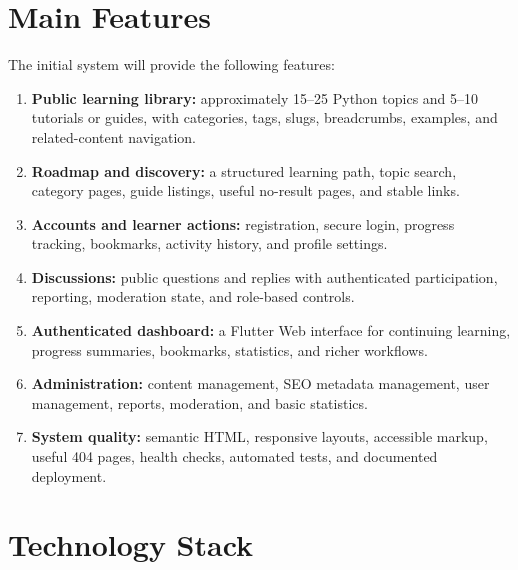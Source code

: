 \documentclass[11pt,a4paper]{article}
\begin{document}
\section{Main Features}

The initial system will provide the following features:

\begin{enumerate}
  \item \textbf{Public learning library:} approximately 15--25 Python topics and
        5--10 tutorials or guides, with categories, tags, slugs, breadcrumbs,
        examples, and related-content navigation.
  \item \textbf{Roadmap and discovery:} a structured learning path, topic search,
        category pages, guide listings, useful no-result pages, and stable links.
  \item \textbf{Accounts and learner actions:} registration, secure login, progress
        tracking, bookmarks, activity history, and profile settings.
  \item \textbf{Discussions:} public questions and replies with authenticated
        participation, reporting, moderation state, and role-based controls.
  \item \textbf{Authenticated dashboard:} a Flutter Web interface for continuing
        learning, progress summaries, bookmarks, statistics, and richer workflows.
  \item \textbf{Administration:} content management, SEO metadata management,
        user management, reports, moderation, and basic statistics.
  \item \textbf{System quality:} semantic HTML, responsive layouts, accessible
        markup, useful 404 pages, health checks, automated tests, and documented
        deployment.
\end{enumerate}

\section{Technology Stack}
\end{document}
